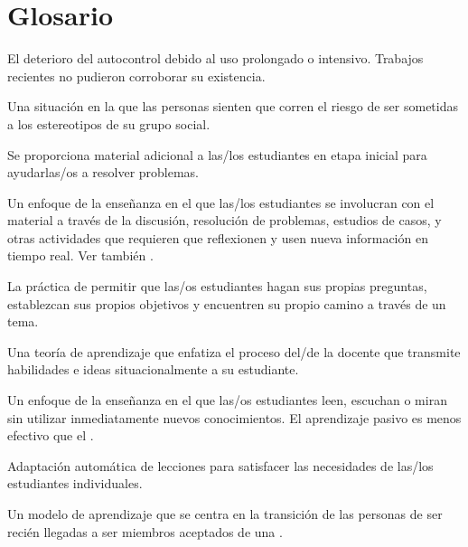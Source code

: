 \chapter{Glosario}\label{s:gloss}

\begin{description}

 El deterioro del autocontrol debido al uso prolongado o intensivo.
Trabajos recientes no pudieron corroborar su existencia.

 Una situación en la que las personas sienten que corren el riesgo de ser sometidas a los estereotipos de su grupo social.

 Se proporciona material adicional a las/los estudiantes
en etapa inicial para ayudarlas/os a resolver problemas.

 Un enfoque de la enseñanza en el que
las/los estudiantes se involucran con el material a través de la discusión, resolución de problemas, estudios de casos,
y otras actividades que requieren que reflexionen y usen nueva información en
tiempo real. Ver también .

 La práctica de permitir que las/os estudiantes hagan sus propias preguntas, establezcan sus propios objetivos y encuentren su propio camino a través de un tema.

 Una teoría de
aprendizaje que enfatiza el proceso del/de la docente que transmite habilidades e ideas
situacionalmente  a su estudiante.

 Un enfoque de la enseñanza en el que las/os estudiantes leen, escuchan o miran sin utilizar inmediatamente nuevos conocimientos. El aprendizaje pasivo es menos efectivo que el .

 Adaptación automática de lecciones para satisfacer las necesidades de las/los estudiantes individuales.

 Un modelo de aprendizaje que se centra en la transición de las personas de ser recién llegadas a ser miembros aceptados de una
.


\end{description}
